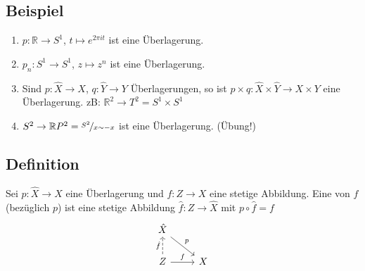 \subsection[Beispiele für Überlagerungen]{Beispiel} %
\label{sub:106}
\begin{enumerate}[(1)]
	\item $p : \mathds{R} \to S^1$, $t \mapsto e^{2 \pi  i t}$ ist eine Überlagerung.
	\item $p_n : S^1 \to S^1$, $z \mapsto z^n$ ist eine Überlagerung.
	\item Sind $p : \hat{X} \to X$, $q : \hat{Y} \to Y$ Überlagerungen, so ist $p \times q : \hat{X} \times \hat{Y} \to X \times Y$ eine Überlagerung.
	zB: $\mathds{R}^2 \to T^2 = S^1 \times S^1$
	\item $S^2 \to \mathds{R}P^2= \nicefrac{S^2}{x \sim -x}$ ist eine Überlagerung. \hfill (Übung!)
\end{enumerate}

\subsection[Definition: Hebung]{Definition} %
\label{sub:107}
Sei $p : \hat{X} \to X$ eine Überlagerung und $f : Z \to X$ eine stetige Abbildung. Eine  von $f$ (bezüglich $p$) ist eine stetige Abbildung 
$\hat{f} : Z \to \hat{X}$ mit $p \circ  \hat{f} = f$
\[
	\begin{tikzcd}
		\hat{X} \drar{p}&  \\
		Z \rar{f} \uar[dashed]{\hat{f}}& X
	\end{tikzcd}
\]

